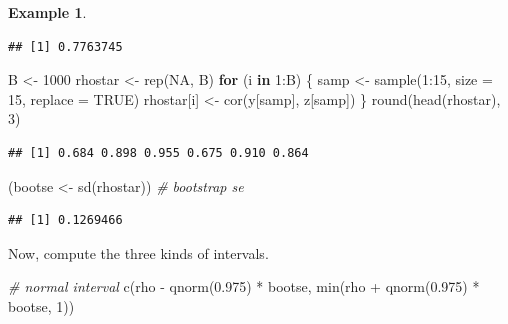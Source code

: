 \documentclass[
]{book}
\newenvironment{Shaded}{\begin{snugshade}}{\end{snugshade}}
\newcommand{\AttributeTok}[1]{\textcolor[rgb]{0.77,0.63,0.00}{#1}}
\newcommand{\CommentTok}[1]{\textcolor[rgb]{0.56,0.35,0.01}{\textit{#1}}}
\newcommand{\ConstantTok}[1]{\textcolor[rgb]{0.00,0.00,0.00}{#1}}
\newcommand{\ControlFlowTok}[1]{\textcolor[rgb]{0.13,0.29,0.53}{\textbf{#1}}}
\newcommand{\DecValTok}[1]{\textcolor[rgb]{0.00,0.00,0.81}{#1}}
\newcommand{\FloatTok}[1]{\textcolor[rgb]{0.00,0.00,0.81}{#1}}
\newcommand{\FunctionTok}[1]{\textcolor[rgb]{0.00,0.00,0.00}{#1}}
\newcommand{\NormalTok}[1]{#1}
\newcommand{\OtherTok}[1]{\textcolor[rgb]{0.56,0.35,0.01}{#1}}
\newcommand{\SpecialCharTok}[1]{\textcolor[rgb]{0.00,0.00,0.00}{#1}}
\theoremstyle{definition}
\theoremstyle{definition}
\newtheorem{example}{Example}[chapter]
\theoremstyle{definition}
\theoremstyle{definition}
\theoremstyle{remark}
\begin{document}
\begin{example}
\begin{verbatim}
## [1] 0.7763745
\end{verbatim}

\begin{Shaded}
\begin{Highlighting}[]
\NormalTok{B }\OtherTok{\textless{}{-}} \DecValTok{1000}
\NormalTok{rhostar }\OtherTok{\textless{}{-}} \FunctionTok{rep}\NormalTok{(}\ConstantTok{NA}\NormalTok{, B)}
\ControlFlowTok{for}\NormalTok{ (i }\ControlFlowTok{in} \DecValTok{1}\SpecialCharTok{:}\NormalTok{B) \{}
\NormalTok{  samp }\OtherTok{\textless{}{-}} \FunctionTok{sample}\NormalTok{(}\DecValTok{1}\SpecialCharTok{:}\DecValTok{15}\NormalTok{, }\AttributeTok{size =} \DecValTok{15}\NormalTok{, }\AttributeTok{replace =} \ConstantTok{TRUE}\NormalTok{)}
\NormalTok{  rhostar[i] }\OtherTok{\textless{}{-}} \FunctionTok{cor}\NormalTok{(y[samp], z[samp])}
\NormalTok{\}}
\FunctionTok{round}\NormalTok{(}\FunctionTok{head}\NormalTok{(rhostar), }\DecValTok{3}\NormalTok{)}
\end{Highlighting}
\end{Shaded}

\begin{verbatim}
## [1] 0.684 0.898 0.955 0.675 0.910 0.864
\end{verbatim}

\begin{Shaded}
\begin{Highlighting}[]
\NormalTok{(bootse }\OtherTok{\textless{}{-}} \FunctionTok{sd}\NormalTok{(rhostar))  }\CommentTok{\# bootstrap se}
\end{Highlighting}
\end{Shaded}

\begin{verbatim}
## [1] 0.1269466
\end{verbatim}

Now, compute the three kinds of intervals.

\begin{Shaded}
\begin{Highlighting}[]
\CommentTok{\# normal interval}
\FunctionTok{c}\NormalTok{(rho }\SpecialCharTok{{-}} \FunctionTok{qnorm}\NormalTok{(}\FloatTok{0.975}\NormalTok{) }\SpecialCharTok{*}\NormalTok{ bootse, }\FunctionTok{min}\NormalTok{(rho }\SpecialCharTok{+} \FunctionTok{qnorm}\NormalTok{(}\FloatTok{0.975}\NormalTok{) }\SpecialCharTok{*}\NormalTok{ bootse, }\DecValTok{1}\NormalTok{))}
\end{Highlighting}
\end{Shaded}


\end{example}
\end{document}
